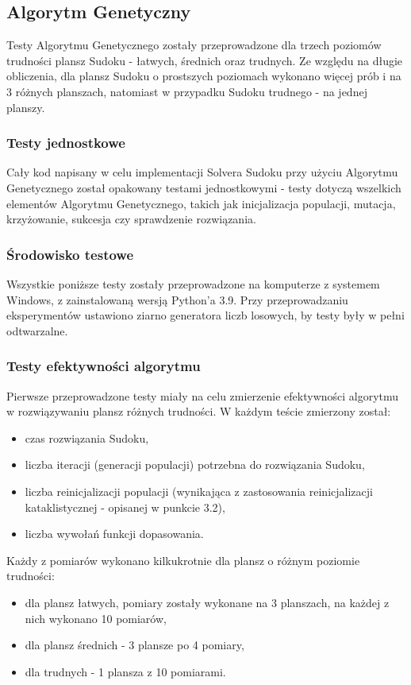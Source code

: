 \documentclass[11pt]{scrartcl} %
\begin{document}
\subsection{Algorytm Genetyczny}
Testy Algorytmu Genetycznego zostały przeprowadzone dla trzech poziomów trudności plansz Sudoku - łatwych, średnich oraz trudnych. Ze względu na długie obliczenia, dla plansz Sudoku o prostszych poziomach wykonano więcej prób i na 3 różnych planszach, natomiast w przypadku Sudoku trudnego - na jednej planszy.

\subsubsection{Testy jednostkowe}
Cały kod napisany w celu implementacji Solvera Sudoku przy użyciu Algorytmu Genetycznego został opakowany testami jednostkowymi - testy dotyczą wszelkich elementów Algorytmu Genetycznego, takich jak inicjalizacja populacji, mutacja, krzyżowanie, sukcesja czy sprawdzenie rozwiązania.

\subsubsection{Środowisko testowe}
Wszystkie poniższe testy zostały przeprowadzone na komputerze z systemem Windows, z zainstalowaną wersją Python'a 3.9. Przy przeprowadzaniu eksperymentów ustawiono ziarno generatora liczb losowych, by testy były w pełni odtwarzalne. 

\subsubsection{Testy efektywności algorytmu}
Pierwsze przeprowadzone testy miały na celu zmierzenie efektywności algorytmu w rozwiązywaniu plansz różnych trudności. W każdym teście zmierzony został:
\begin{itemize}
	\item czas rozwiązania Sudoku,
    \item liczba iteracji (generacji populacji) potrzebna do rozwiązania Sudoku,
    \item liczba reinicjalizacji populacji (wynikająca z zastosowania reinicjalizacji kataklistycznej - opisanej w punkcie 3.2),
    \item liczba wywołań funkcji dopasowania.
\end{itemize}

Każdy z pomiarów wykonano kilkukrotnie dla plansz o różnym poziomie trudności:
\begin{itemize}
	\item dla plansz łatwych, pomiary zostały wykonane na 3 planszach, na każdej z nich wykonano 10 pomiarów,
    \item dla plansz średnich - 3 plansze po 4 pomiary,
    \item dla trudnych - 1 plansza z 10 pomiarami.
\end{itemize}
\end{document}
